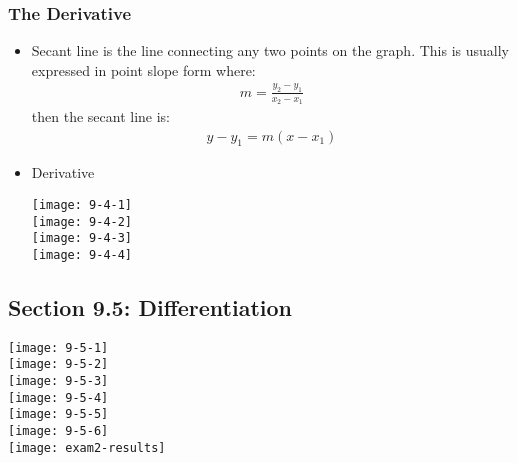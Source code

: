 \documentclass[14pt]{extarticle}
\begin{document}
\subsubsection*{The Derivative}
\begin{itemize}
	\item Secant line is the line connecting any two points on the graph. This is usually expressed in point slope form where:
	\begin{align*}
		m = \frac{y_2-y_1}{x_2-x_1}
	\end{align*}
	then the secant line is:
	\begin{align*}
		y-y_1 = m(x-x_1)
	\end{align*}
\item Derivative
\begin{center}
	\texttt{[image: 9-4-1]} \\
	\texttt{[image: 9-4-2]} \\
	\texttt{[image: 9-4-3]} \\
	\texttt{[image: 9-4-4]} \\
\end{center}
\end{itemize}

\subsection*{Section 9.5: Differentiation}
\begin{center}
	\texttt{[image: 9-5-1]} \\
	\texttt{[image: 9-5-2]} \\
	\texttt{[image: 9-5-3]} \\
	\texttt{[image: 9-5-4]} \\
	\texttt{[image: 9-5-5]} \\
	\texttt{[image: 9-5-6]} \\
	\texttt{[image: exam2-results]}
\end{center}
\end{document}
